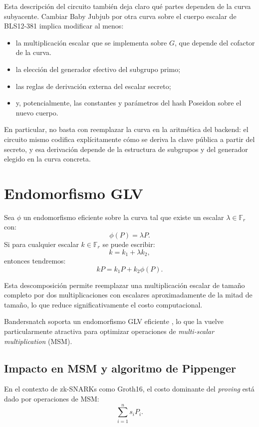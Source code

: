 \documentclass[11pt,a4paper]{article}
\begin{document}
	Esta descripción del circuito también deja claro qué partes dependen de la curva subyacente. Cambiar Baby Jubjub por otra curva sobre el cuerpo escalar de BLS12-381 implica modificar al menos:
	\begin{itemize}
		\item la multiplicación escalar que se implementa sobre $G$, que depende del cofactor de la curva.
		\item la elección del generador efectivo del subgrupo primo;
		\item las reglas de derivación externa del escalar secreto;
		\item y, potencialmente, las constantes y parámetros del hash Poseidon sobre el nuevo cuerpo.
	\end{itemize}
	
	En particular, no basta con reemplazar la curva en la aritmética del backend: el circuito mismo codifica explícitamente cómo se deriva la clave pública a partir del secreto, y esa derivación depende de la estructura de subgrupos y del generador elegido en la curva concreta.
	
	\section{Endomorfismo GLV}
	
	Sea $\phi$ un endomorfismo eficiente sobre la curva tal que existe un escalar $\lambda \in \mathbb{F}_r$ con:
	\[
	\phi(P) = \lambda P.
	\]
	Si para cualquier escalar $k \in \mathbb{F}_r$ se puede escribir:
	\[
	k = k_1 + \lambda k_2,
	\]
	entonces tendremos:
	\[
	kP = k_1 P + k_2 \phi(P).
	\]
	
	Esta descomposición permite reemplazar una multiplicación escalar de tamaño completo por dos multiplicaciones con escalares aproximadamente de la mitad de tamaño, lo que reduce significativamente el costo computacional.
	
	Bandersnatch soporta un endomorfismo GLV eficiente \cite{bandersnatch}, lo que la vuelve particularmente atractiva para optimizar operaciones de \emph{multi-scalar multiplication} (MSM).
	
	\subsection{Impacto en MSM y algoritmo de Pippenger}
	
	En el contexto de zk-SNARKs como Groth16, el costo dominante del \emph{proving} está dado por operaciones de MSM:
	\[
	\sum_{i=1}^n s_i P_i.
	\]
	
\end{document}
